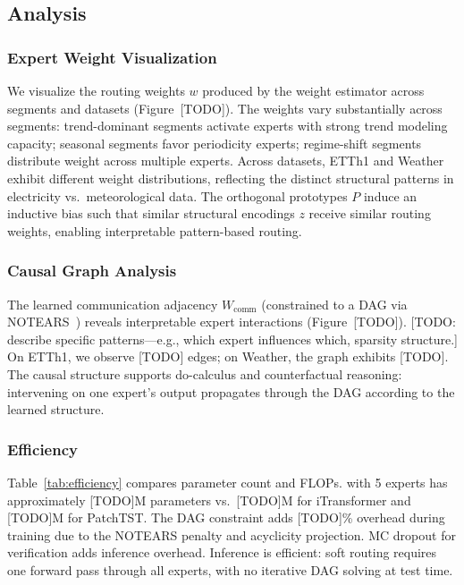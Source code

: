 \subsection{Analysis}

\subsubsection{Expert Weight Visualization}

We visualize the routing weights $w$ produced by the weight estimator across segments and datasets (Figure~[TODO]). The weights vary substantially across segments: trend-dominant segments activate experts with strong trend modeling capacity; seasonal segments favor periodicity experts; regime-shift segments distribute weight across multiple experts. Across datasets, ETTh1 and Weather exhibit different weight distributions, reflecting the distinct structural patterns in electricity vs.\ meteorological data. The orthogonal prototypes $P$ induce an inductive bias such that similar structural encodings $z$ receive similar routing weights, enabling interpretable pattern-based routing.

\subsubsection{Causal Graph Analysis}

The learned communication adjacency $W_{\text{comm}}$ (constrained to a DAG via NOTEARS~\cite{zheng2018dags}) reveals interpretable expert interactions (Figure~[TODO]). [TODO: describe specific patterns---e.g., which expert influences which, sparsity structure.] On ETTh1, we observe [TODO] edges; on Weather, the graph exhibits [TODO]. The causal structure supports do-calculus and counterfactual reasoning: intervening on one expert's output propagates through the DAG according to the learned structure.

\subsubsection{Efficiency}

Table~\ref{tab:efficiency} compares parameter count and FLOPs. \model with 5 experts has approximately [TODO]M parameters vs.\ [TODO]M for iTransformer and [TODO]M for PatchTST. The DAG constraint adds [TODO]\% overhead during training due to the NOTEARS penalty and acyclicity projection. MC dropout for verification adds inference overhead. Inference is efficient: soft routing requires one forward pass through all experts, with no iterative DAG solving at test time.

